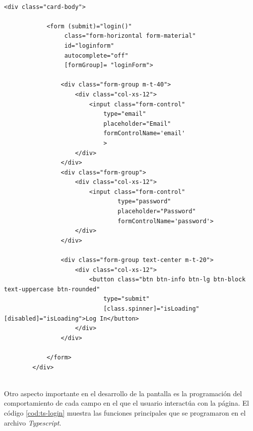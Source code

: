 \begin{lstlisting}[label=cod:html-login,caption=Desarrollo de código HTML para la pantalla de login teniendo en cuenta estilos de diseño CSS.] 

<div class="card-body">

            <form (submit)="login()" 
                 class="form-horizontal form-material" 
                 id="loginform"
                 autocomplete="off"
                 [formGroup]= "loginForm">
               
                <div class="form-group m-t-40">
                    <div class="col-xs-12">
                        <input class="form-control" 
                            type="email" 
                            placeholder="Email"
                            formControlName='email'
                            >
                    </div>
                </div>
                <div class="form-group">
                    <div class="col-xs-12">
                        <input class="form-control" 
                                type="password"
                                placeholder="Password"
                                formControlName='password'>
                    </div>
                </div>
                
                <div class="form-group text-center m-t-20">
                    <div class="col-xs-12">
                        <button class="btn btn-info btn-lg btn-block text-uppercase btn-rounded" 
                            type="submit"
                            [class.spinner]="isLoading" [disabled]="isLoading">Log In</button>
                    </div>
                </div>
                      
            </form>
        </div>


\end{lstlisting} 

Otro aspecto importante en el desarrollo de la pantalla es la programación del comportamiento de cada campo en el que el usuario interactúa con la página. El código \ref{cod:ts-login} muestra las funciones principales que se programaron en el archivo \textit{Typescript}.

